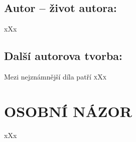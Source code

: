 \documentclass{extarticle} %
\begin{document}



\subsection*{Autor {\ssmall -- život autora:}}
\noindent 
xXx


\subsection*{Další autorova tvorba:}
\noindent 
Mezi nejznámnější díla patří \textsc{xXx}






\section*{OSOBNÍ NÁZOR}
\noindent 
xXx
\end{document}
